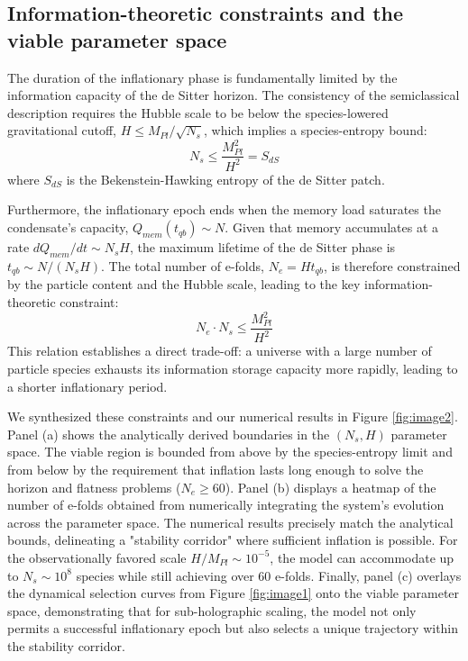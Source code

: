 \documentclass[]{article}
\begin{document}
\subsection{Information-theoretic constraints and the viable parameter space}
The duration of the inflationary phase is fundamentally limited by the information capacity of the de Sitter horizon. The consistency of the semiclassical description requires the Hubble scale to be below the species-lowered gravitational cutoff, $H \leq M_{Pl}/\sqrt{N_s}$, which implies a species-entropy bound:
\begin{equation}
    N_s \leq \frac{M_{Pl}^2}{H^2} = S_{dS}
\end{equation}
where $S_{dS}$ is the Bekenstein-Hawking entropy of the de Sitter patch.

Furthermore, the inflationary epoch ends when the memory load saturates the condensate's capacity, $Q_{mem}(t_{qb}) \sim N$. Given that memory accumulates at a rate $dQ_{mem}/dt \sim N_s H$, the maximum lifetime of the de Sitter phase is $t_{qb} \sim N/(N_s H)$. The total number of e-folds, $N_e = H t_{qb}$, is therefore constrained by the particle content and the Hubble scale, leading to the key information-theoretic constraint:
\begin{equation}
    N_e \cdot N_s \leq \frac{M_{Pl}^2}{H^2}
    \label{eq:NeNs_constraint}
\end{equation}
This relation establishes a direct trade-off: a universe with a large number of particle species exhausts its information storage capacity more rapidly, leading to a shorter inflationary period.

We synthesized these constraints and our numerical results in Figure \ref{fig:image2}. Panel (a) shows the analytically derived boundaries in the $(N_s, H)$ parameter space. The viable region is bounded from above by the species-entropy limit and from below by the requirement that inflation lasts long enough to solve the horizon and flatness problems ($N_e \geq 60$). Panel (b) displays a heatmap of the number of e-folds obtained from numerically integrating the system's evolution across the parameter space. The numerical results precisely match the analytical bounds, delineating a "stability corridor" where sufficient inflation is possible. For the observationally favored scale $H/M_{Pl} \sim 10^{-5}$, the model can accommodate up to $N_s \sim 10^8$ species while still achieving over 60 e-folds. Finally, panel (c) overlays the dynamical selection curves from Figure \ref{fig:image1} onto the viable parameter space, demonstrating that for sub-holographic scaling, the model not only permits a successful inflationary epoch but also selects a unique trajectory within the stability corridor.
\end{document}
